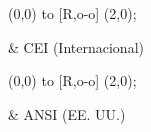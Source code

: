 \documentclass[dvisvgm,tikz]{standalone}
\begin{document}
\begin{table}[ht]
  \centering
  \begin{tblr}{}
    \begin{circuitikz}[european]
      \draw (0,0) to [R,o-o] (2,0);
    \end{circuitikz}
    & CEI (Internacional) \\
    \begin{circuitikz}
      \draw (0,0) to [R,o-o] (2,0);
    \end{circuitikz}
    & ANSI (EE. UU.) \\
  \end{tblr}
\end{table}
\end{document}
